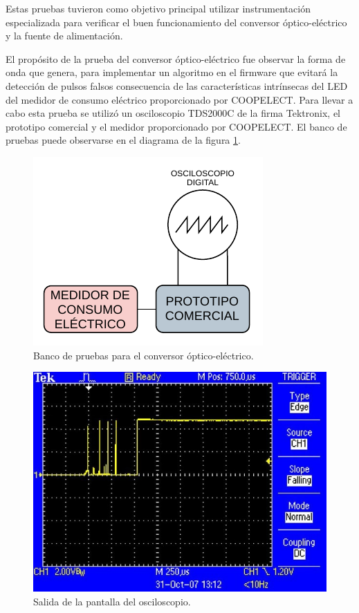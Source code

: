 Estas pruebas tuvieron como objetivo principal utilizar instrumentación especializada para verificar el buen funcionamiento del conversor óptico-eléctrico y la fuente de alimentación. 

El propósito de la prueba del conversor óptico-eléctrico fue observar la forma de onda que genera, para implementar un algoritmo en el firmware que evitará la detección de pulsos falsos consecuencia de las características intrínsecas del LED del medidor de consumo eléctrico proporcionado por COOPELECT. Para llevar a cabo esta prueba se utilizó un osciloscopio TDS2000C de la firma Tektronix, el prototipo comercial y el medidor proporcionado por COOPELECT. El banco de pruebas puede observarse en el diagrama de la figura \ref{fig:testHWBankCOE}.

\begin{figure}[ht]
	\centering
	\includegraphics[scale=1.2]{./Figures/test_pulses_bank.pdf}
	\caption{Banco de pruebas para el conversor óptico-eléctrico.}
	\label{fig:testHWBankCOE}
\end{figure}

\begin{figure}[ht]
	\centering
	\includegraphics[scale=0.5]{./Figures/pulses_debounce.jpg}
	\caption{Salida de la pantalla del osciloscopio.}
	\label{fig:testHWPhoto}
\end{figure}

